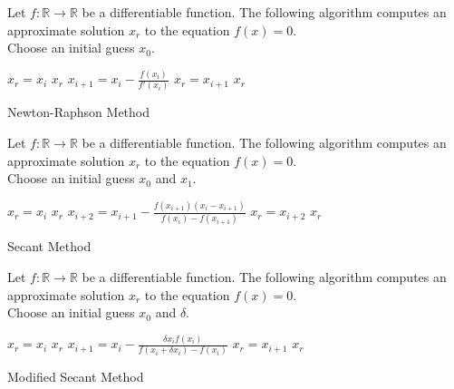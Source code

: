 \begin{algorithm}\label{alg:c1}
Let $f:\mathbb{R}\rightarrow\mathbb{R}$ be a differentiable function. The following algorithm computes an approximate solution $x_{r}$ to the equation $f(x)=0$.\\
Choose an initial guess $x_{0}$.
\begin{algorithmic}
    \State $x_{r}=x_{i}$
    \State \Return $x_{r}$
  \EndIf
  \State $x_{i+1}=x_{i}-\frac{f(x_{i})}{f'(x_{i})}$
    \State $x_{r}=x_{i+1}$
    \State \Return $x_{r}$
  \EndIf
\EndFor
\end{algorithmic}
\caption{Newton-Raphson Method}
\end{algorithm}

\begin{algorithm}\label{alg:c2}
Let $f:\mathbb{R}\rightarrow\mathbb{R}$ be a differentiable function. The following algorithm computes an approximate solution $x_{r}$ to the equation $f(x)=0$.\\
Choose an initial guess $x_{0}$ and $x_{1}$.
\begin{algorithmic}
    \State $x_{r}=x_{i}$
    \State \Return $x_{r}$
  \EndIf
  \State $x_{i+2}=x_{i+1}-\frac{f(x_{i+1})(x_{i}-x_{i+1})}{f(x_{i})-f(x_{i+1})}$
    \State $x_{r}=x_{i+2}$
    \State \Return $x_{r}$
  \EndIf
\EndFor
\end{algorithmic}
\caption{Secant Method}
\end{algorithm}

\begin{algorithm}\label{alg:c3}
Let $f:\mathbb{R}\rightarrow\mathbb{R}$ be a differentiable function. The following algorithm computes an approximate solution $x_{r}$ to the equation $f(x)=0$.\\
Choose an initial guess $x_{0}$ and $\delta$.
\begin{algorithmic}
    \State $x_{r}=x_{i}$
    \State \Return $x_{r}$
  \EndIf
  \State $x_{i+1}=x_{i}-\frac{\delta x_{i}f(x_{i})}{f(x_{i}+\delta x_{i})-f(x_{i})}$
    \State $x_{r}=x_{i+1}$
    \State \Return $x_{r}$
  \EndIf
\EndFor
\end{algorithmic}
\caption{Modified Secant Method}
\end{algorithm}

